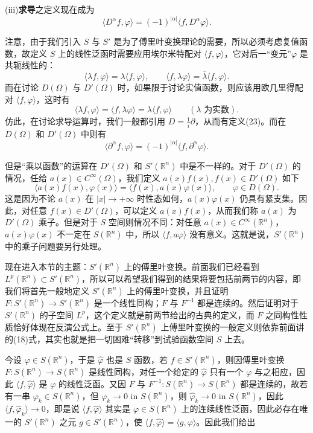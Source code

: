(iii)\textbf{求导}\quad 之定义现在成为
\begin{equation}
 \langle D^\alpha f,\varphi\rangle=(-1)^{|\alpha|}\langle f,D^\alpha\varphi\rangle.
 \tag{23}
\end{equation}

注意，由于我们引入 $S$ 与 $S'$ 是为了傅里叶变换理论的需要，所以必须考虑复值函数，故定义 $S$ 上的线性泛函时需要应用埃尔米特配对 $\langle f,\varphi\rangle$，它对后一“变元”$\varphi$ 是共轭线性的：
\[
 \langle\lambda f,\varphi\rangle=\lambda\langle f,\varphi\rangle,
 \qquad
 \langle f,\lambda\varphi\rangle=\overline\lambda\langle f,\varphi\rangle.
\]
而在讨论 $D(\Omega)$ 与 $D'(\Omega)$ 时，如果限于讨论实值函数，则应该用欧几里得配对 $\langle f,\varphi\rangle$，这时有
\[
 \langle\lambda f,\varphi\rangle=\langle f,\lambda\varphi\rangle=\lambda\langle f,\varphi\rangle\qquad(\lambda\text{ 为实数}).
\]
仿此，在讨论求导运算时，我们一般都引用 $D=\frac1i\partial$，从而有定义(23)。而在 $D(\Omega)$ 和 $D'(\Omega)$ 中则有
\[
 \langle\partial^\alpha f,\varphi\rangle=(-1)^{|\alpha|}\langle f,\partial^\alpha\varphi\rangle.
\]

但是“乘以函数”的运算在 $D'(\Omega)$ 和 $S'(\mathbb R^n)$ 中是不一样的。对于 $D'(\Omega)$ 的情况，任给 $a(x)\in C^\infty(\Omega)$，我们定义 $a(x)f(x),f(x)\in D'(\Omega)$ 如下
\[
 \langle a(x)f(x),\varphi(x)\rangle=\langle f(x),a(x)\varphi(x)\rangle,
 \qquad \varphi\in D(\Omega).
\]
这是因为不论 $a(x)$ 在 $|x|\to+\infty$ 时性态如何，$a(x)\varphi(x)$ 仍具有紧支集。因此，对任意 $f(x)\in D'(\Omega)$，可以定义 $a(x)f(x)$，从而我们称 $a(x)$ 为 $D'(\Omega)$ 乘子。但是对于 $S$ 空间则情况不同：对任意 $a(x)\in C^\infty(\mathbb R^n)$，$a(x)\varphi(x)$ 不一定在 $S(\mathbb R^n)$ 中，所以 $\langle f,a\varphi\rangle$ 没有意义。这就是说，$S'(\mathbb R^n)$ 中的乘子问题要另行处理。

现在进入本节的主题：$S'(\mathbb R^n)$ 上的傅里叶变换。前面我们已经看到 $L^p(\mathbb R^n)\subset S'(\mathbb R^n)$，所以可以希望我们得到的结果将要包括前两节的内容，即我们将首先一般地定义 $S'(\mathbb R^n)$ 上的傅里叶变换，并且证明 $F:S'(\mathbb R^n)\to S'(\mathbb R^n)$ 是一个线性同构；$F$ 与 $F^{-1}$ 都是连续的。然后证明对于 $S'(\mathbb R^n)$ 的子空间 $L^p$，这个定义就是前两节给出的古典的定义，而 $F$ 之同构性性质恰好体现在反演公式上。至于 $S'(\mathbb R^n)$ 上傅里叶变换的一般定义则依靠前面讲的(18)式，其实也就是把一切困难“转移”到试验函数空间 $S$ 上去。

今设 $\varphi\in S(\mathbb R^n)$，于是 $\widehat\varphi$ 也是 $S$ 函数，若 $f\in S'(\mathbb R^n)$，则因傅里叶变换 $F:S(\mathbb R^n)\to S(\mathbb R^n)$ 是线性同构，对任一个给定的 $\widehat\varphi$ 只有一个 $\varphi$ 与之相应，因此 $\langle f,\widehat\varphi\rangle$ 是 $\varphi$ 的线性泛函。又因 $F$ 与 $F^{-1}:S(\mathbb R^n)\to S(\mathbb R^n)$ 都是连续的，故若有一串 $\varphi_k\in S(\mathbb R^n)$，但 $\varphi_k\to0$ in $S(\mathbb R^n)$，则 $\widehat\varphi_k\to0$ in $S(\mathbb R^n)$，因此 $\langle f,\widehat\varphi_k\rangle\to0$，即是说 $\langle f,\widehat\varphi\rangle$ 其实是 $\varphi\in S(\mathbb R^n)$ 上的连续线性泛函，因此必存在唯一的 $S'(\mathbb R^n)$ 之元 $g\in S'(\mathbb R^n)$，使 $\langle f,\widehat\varphi\rangle=\langle g,\varphi\rangle$。因此我们给出

